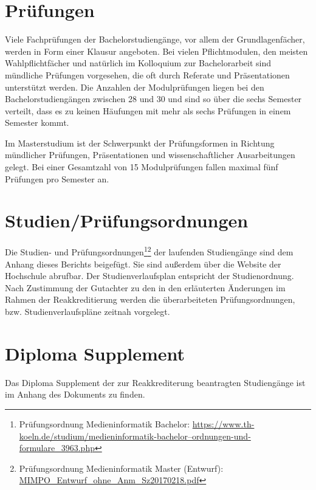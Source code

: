 \section{Prüfungen}\label{pruxfcfungen}

Viele Fachprüfungen der Bachelorstudiengänge, vor allem der
Grundlagenfächer, werden in Form einer Klausur angeboten. Bei vielen
Pflichtmodulen, den meisten Wahlpflichtfächer und natürlich im
Kolloquium zur Bachelorarbeit sind mündliche Prüfungen vorgesehen, die
oft durch Referate und Präsentationen unterstützt werden. Die Anzahlen
der Modulprüfungen liegen bei den Bachelorstudiengängen zwischen 28 und
30 und sind so über die sechs Semester verteilt, dass es zu keinen
Häufungen mit mehr als sechs Prüfungen in einem Semester kommt.

Im Masterstudium ist der Schwerpunkt der Prüfungsformen in Richtung
mündlicher Prüfungen, Präsentationen und wissenschaftlicher
Ausarbeitungen gelegt. Bei einer Gesamtzahl von 15 Modulprüfungen fallen
maximal fünf Prüfungen pro Semester an.

\section{Studien/Prüfungsordnungen}\label{studienpruxfcfungsordnungen}

Die Studien- und Prüfungsordnungen\footnote{Prüfungsordnung
  Medieninformatik Bachelor:
  \href{https://www.th-koeln.de/studium/medieninformatik-bachelor--ordnungen-und-formulare_3963.php}{https://www.th-koeln.de/studium/medieninformatik-bachelor--ordnungen-und-formulare\_3963.php}}\footnote{Prüfungsordnung
  Medieninformatik Master (Entwurf):
  \href{../anhaenge/MIMPO_Entwurf_ohne_Anm_Sz20170218.pdf}{MIMPO\_Entwurf\_ohne\_Anm\_Sz20170218.pdf}}
der laufenden Studiengänge sind dem Anhang dieses Berichts beigefügt.
Sie sind außerdem über die Website der Hochschule abrufbar. Der
Studienverlaufsplan entspricht der Studienordnung. Nach Zustimmung der
Gutachter zu den in den erläuterten Änderungen im Rahmen der
Reakkreditierung werden die überarbeiteten Prüfungsordnungen, bzw.
Studienverlaufspläne zeitnah vorgelegt.

\section{Diploma Supplement}\label{diploma-supplement}

Das Diploma Supplement der zur Reakkrediterung beantragten Studiengänge
ist im Anhang des Dokuments zu finden.

